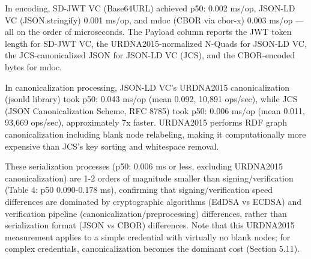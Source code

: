 \documentclass[conference]{IEEEtran}
\begin{document}
\begin{table}[!t]
\centering
\caption{Table 9. Serialization Speed (without cryptographic processing; medians across N=2,000 $\times$ 5 runs)}\label{tab:9}
\footnotesize
{}
\end{table}

In encoding, SD-JWT VC (Base64URL) achieved p50: 0.002 ms/op, JSON-LD VC (JSON.stringify) 0.001 ms/op, and mdoc (CBOR via cbor-x) 0.003 ms/op --- all on the order of microseconds. The Payload column reports the JWT token length for SD-JWT VC, the URDNA2015-normalized N-Quads for JSON-LD VC, the JCS-canonicalized JSON for JSON-LD VC (JCS), and the CBOR-encoded bytes for mdoc.

In canonicalization processing, JSON-LD VC's URDNA2015 canonicalization (jsonld library) took p50: 0.043 ms/op (mean 0.092, 10,891 ops/sec), while JCS (JSON Canonicalization Scheme, RFC 8785) took p50: 0.006 ms/op (mean 0.011, 93,669 ops/sec), approximately 7x faster. URDNA2015 performs RDF graph canonicalization including blank node relabeling, making it computationally more expensive than JCS's key sorting and whitespace removal.

These serialization processes (p50: 0.006 ms or less, excluding URDNA2015 canonicalization) are 1-2 orders of magnitude smaller than signing/verification (Table 4: p50 0.090-0.178 ms), confirming that signing/verification speed differences are dominated by cryptographic algorithms (EdDSA vs ECDSA) and verification pipeline (canonicalization/preprocessing) differences, rather than serialization format (JSON vs CBOR) differences. Note that this URDNA2015 measurement applies to a simple credential with virtually no blank nodes; for complex credentials, canonicalization becomes the dominant cost (Section 5.11).
\end{document}
